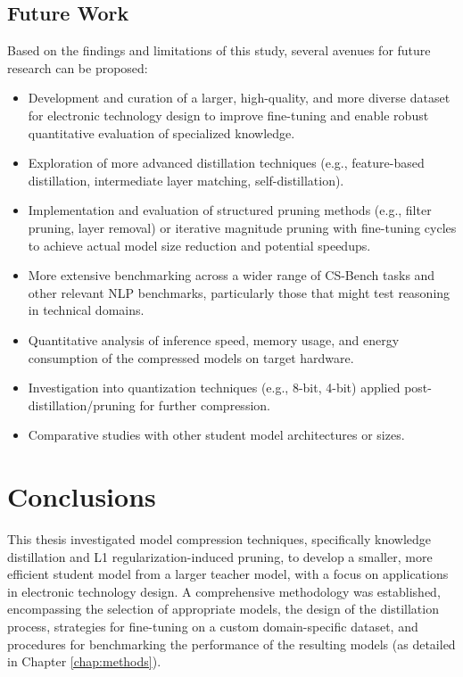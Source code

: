 \documentclass[12pt, a4paper]{report}
\begin{document}
\section{Future Work}
\label{sec:future_work_discussion}
Based on the findings and limitations of this study, several avenues for future research can be proposed:
\begin{itemize}
    \item Development and curation of a larger, high-quality, and more diverse dataset for electronic technology design to improve fine-tuning and enable robust quantitative evaluation of specialized knowledge.
    \item Exploration of more advanced distillation techniques (e.g., feature-based distillation, intermediate layer matching, self-distillation).
    \item Implementation and evaluation of structured pruning methods (e.g., filter pruning, layer removal) or iterative magnitude pruning with fine-tuning cycles to achieve actual model size reduction and potential speedups.
    \item More extensive benchmarking across a wider range of CS-Bench tasks and other relevant NLP benchmarks, particularly those that might test reasoning in technical domains.
    \item Quantitative analysis of inference speed, memory usage, and energy consumption of the compressed models on target hardware.
    \item Investigation into quantization techniques (e.g., 8-bit, 4-bit) applied post-distillation/pruning for further compression.
    \item Comparative studies with other student model architectures or sizes.
\end{itemize}

\chapter{Conclusions}
\label{chap:conclusions_final}
This thesis investigated model compression techniques, specifically knowledge distillation and L1 regularization-induced pruning, to develop a smaller, more efficient student model from a larger teacher model, with a focus on applications in electronic technology design. A comprehensive methodology was established, encompassing the selection of appropriate models, the design of the distillation process, strategies for fine-tuning on a custom domain-specific dataset, and procedures for benchmarking the performance of the resulting models (as detailed in Chapter \ref{chap:methods}).
\end{document}

